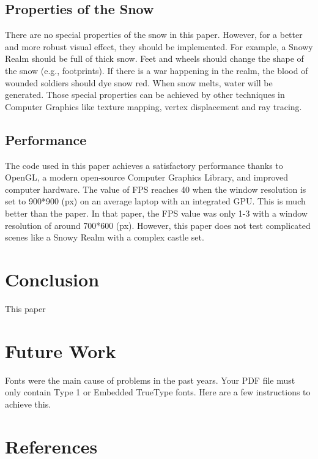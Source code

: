 \documentclass{article}
\begin{document}
\subsection {Properties of the Snow}
There are no special properties of the snow in this paper. However, for a better and more robust visual effect, they should be 
implemented. For example, a Snowy Realm should be full of thick snow. Feet and wheels should change the shape of the snow (e.g.,
footprints). If there is a war happening in the realm, the blood of wounded soldiers should dye snow red. When snow melts, water 
will be generated. Those special properties can be achieved by other techniques in Computer Graphics like texture mapping, vertex
displacement and ray tracing.

\subsection {Performance}
The code used in this paper achieves a satisfactory performance thanks to OpenGL, a modern open-source Computer Graphics Library, 
and improved computer hardware. The value of FPS reaches 40 when the window resolution is set to 900*900 (px) on an average laptop 
with an integrated GPU. This is much better than the paper. In that paper, the FPS value was only 1-3 with a window resolution of 
around 700*600 (px). However, this paper does not test complicated scenes like a Snowy Realm with a complex castle set.

\section{Conclusion}
This paper
\section{Future Work}

Fonts were the main cause of problems in the past years. Your PDF file must only
contain Type 1 or Embedded TrueType fonts. Here are a few instructions to
achieve this.


\section*{References}
\end{document}

